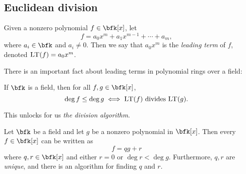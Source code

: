 \documentclass{article}
\DeclareMathOperator{\degree}{deg}
\newcommand{\LT}{\ensuremath{\textsc{LT}}}
\begin{document}
\subsection{Euclidean division}

\begin{definition}
    Given a nonzero polynomial $f \in \bfk[x]$, let
    \[
        f = a_0x^m + a_1x^{m-1} + \cdots + a_m,
    \]
    where $a_i \in \bfk$ and $a_i \neq 0$.
    Then we say that $a_0x^m$ is the \textit{leading term} of $f$, denoted $\LT(f) = a_0x^m$.
\end{definition}

There is an important fact about leading terms in polynomial rings over a field:

\begin{proposition}\label{prop:ltanddegree}
    If $\bfk$ is a field, then for all $f,g \in \bfk[x]$,
    \[
        \degree f \leq \degree g \iff \LT(f) \text{ divides } \LT(g).
    \]
\end{proposition}

This unlocks for us \textit{the division algorithm}.

\begin{proposition}
    Let $\bfk$ be a field and let $g$ be a nonzero polynomial in $\bfk[x]$.
    Then every $f \in \bfk[x]$ can be written as
    \[
        f = qg + r
    \]
    where $q,r \in \bfk[x]$ and either $r=0$ or $\degree r < \degree g$.
    Furthermore, $q,r$ are \textit{unique}, and there is an algorithm for finding $q$ and $r$.
\end{proposition}
\end{document}
